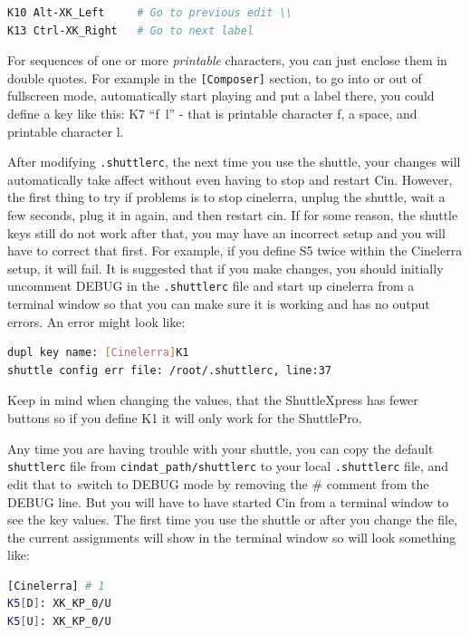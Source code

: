 \begin{lstlisting}[language=bash]
K10 Alt-XK_Left  	# Go to previous edit \\
K13 Ctrl-XK_Right 	# Go to next label
\end{lstlisting}

\noindent For sequences of one or more \textit{printable} characters, you can just enclose them in double quotes.  For example in the \texttt{[Composer]} section, to go into or out of fullscreen mode, automatically start playing and put a label there, you could define a key like this:  K7 “f~l” - that is printable character f, a space, and printable character l.  

After modifying \texttt{.shuttlerc}, the next time you use the shuttle, your changes will automatically take affect without even having to stop and restart Cin.  However, the first thing to try if problems is to stop cinelerra, unplug the shuttle, wait a few seconds, plug it in again, and then restart cin.  If for some reason, the shuttle keys still do not work after that, you may have an incorrect setup and you will have to correct that first.  For example, if you define S5 twice within the Cinelerra setup, it will fail.  It is suggested that if you make changes, you should initially uncomment DEBUG in the \texttt{.shuttlerc} file and start up cinelerra from a terminal window so that you can make sure it is working and has no output errors.  An error might look like:

\begin{lstlisting}[language=Bash]
dupl key name: [Cinelerra]K1 
shuttle config err file: /root/.shuttlerc, line:37
\end{lstlisting}

\noindent Keep in mind when changing the values, that the ShuttleXpress has fewer buttons so if you define K1 it will only work for the ShuttlePro. 

Any time you are having trouble with your shuttle, you can copy the default \texttt{shuttlerc} file from \texttt{{cindat\_path}/shuttlerc} to your local \texttt{.shuttlerc} file, and edit that to\ switch to DEBUG mode by removing the \# comment from the DEBUG line.  But you will have to have started Cin from a terminal window to see the key values. The first time you use the shuttle or after you change the file, the current assignments will show in the terminal window so will look something like:

\begin{lstlisting}[language=Bash]
[Cinelerra] # 1 
K5[D]: XK_KP_0/U 
K5[U]: XK_KP_0/U 
\end{lstlisting}

